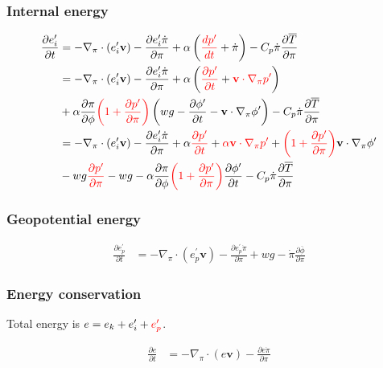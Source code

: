 \documentclass[12pt]{article}
\renewcommand{\d}[2]{\frac{d #1}{d #2}}
\newcommand{\dt}[1]{\d{#1}{t}}
\newcommand{\pd}[2]{\frac{\partial #1}{\partial #2}}
\newcommand{\pdt}[1]{\pd{#1}{t}}
\newcommand{\pdz}[1]{\pd{#1}{\pi}}
\renewcommand{\vec}[1]{\mathbf{#1}}
\begin{document}
\subsubsection{Internal energy}

\begin{align*}
  \pdt{e_i^\prime} & = - \nabla_\pi \cdot \left(e_i^\prime \vec{v}\right) - \pdz{e_i^\prime \dot{\pi}} + \alpha \left({\color{red}\dt{p^\prime}} + \dot{\pi}\right) - C_p \dot{\pi} \pdz{\overline{T}} \\
  & = - \nabla_\pi \cdot \left(e_i^\prime \vec{v}\right) - \pdz{e_i^\prime \dot{\pi}} + \alpha \left({\color{red}\pdt{p^\prime}} + {\color{red}\vec{v} \cdot \nabla_\pi p^\prime}\right) \\
  & + \alpha \pd{\pi}{\phi} {\color{red}\left(1 + \pd{p^\prime}{\pi}\right)} \left(w g - \pdt{\phi^\prime} - \vec{v} \cdot \nabla_\pi \phi^\prime\right) - C_p \dot{\pi} \pd{\overline{T}}{\pi} \\
  & = - \nabla_\pi \cdot \left(e_i^\prime \vec{v}\right) - \pdz{e_i^\prime \dot{\pi}} + \alpha {\color{red}\pdt{p^\prime}} + {\color{red}\alpha \vec{v} \cdot \nabla_\pi p^\prime} + {\color{red}\left(1 + \pd{p^\prime}{\pi}\right)} \vec{v} \cdot \nabla_\pi \phi^\prime \\
  & - w g {\color{red}\pd{p^\prime}{\pi}} - w g - \alpha \pd{\pi}{\phi} {\color{red}\left(1 + \pd{p^\prime}{\pi}\right)} \pdt{\phi^\prime} - C_p \dot{\pi} \pd{\overline{T}}{\pi}
\end{align*}

\subsubsection{Geopotential energy}

\begin{align*}
  \pdt{e_p^\prime} & = - \nabla_\pi \cdot \left(e_p^\prime \vec{v}\right) - \pdz{e_p^\prime \dot{\pi}} + w g - \dot{\pi} \pd{\overline{\phi}}{\pi}
\end{align*}

\subsubsection{Energy conservation}

Total energy is $e = e_k + e_i^\prime + {\color{red}e_p^\prime}$.

\begin{align*}
  \pdt{e} & = - \nabla_\pi \cdot \left(e \vec{v}\right) - \pdz{e \dot{\pi}}
\end{align*}
\end{document}
